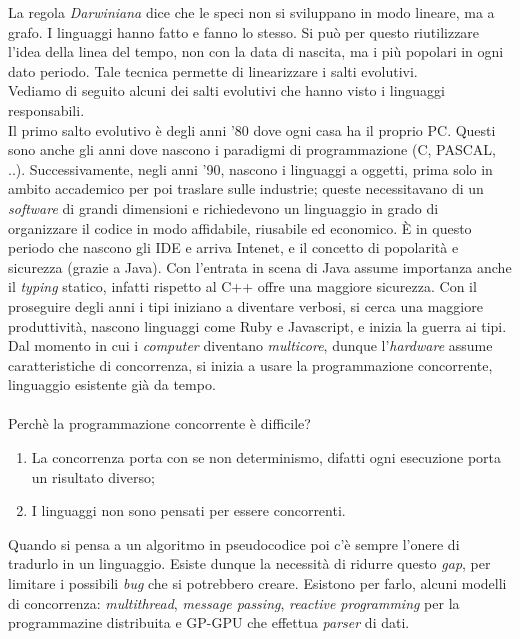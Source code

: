 \documentclass[10pt,a4paper]{book}
\begin{document}
La regola \textit{Darwiniana} dice che le speci non si sviluppano in modo lineare, ma a grafo. I linguaggi hanno fatto e fanno lo stesso. Si pu\`o per questo riutilizzare l'idea della linea del tempo, non con la data di nascita, ma i pi\`u popolari in ogni dato periodo. Tale tecnica permette di linearizzare i salti evolutivi.\\
Vediamo di seguito alcuni dei salti evolutivi che hanno visto i linguaggi responsabili.\\
Il primo salto evolutivo \`e degli anni '80 dove ogni casa ha il proprio PC. Questi sono anche gli anni dove nascono i paradigmi di programmazione (C, PASCAL, ..). Successivamente, negli anni '90, nascono i linguaggi a oggetti, prima solo in ambito accademico per poi traslare sulle industrie; queste necessitavano di un \textit{software} di grandi dimensioni e richiedevono un linguaggio in grado di organizzare il codice in modo affidabile, riusabile ed economico. \`E in questo periodo che nascono gli IDE e arriva Intenet, e il concetto di popolarit\`a e sicurezza (grazie a Java). Con l'entrata in scena di Java assume importanza anche il \textit{typing} statico, infatti rispetto al C++ offre una maggiore sicurezza. Con il proseguire degli anni i tipi iniziano a diventare verbosi, si cerca una maggiore produttivit\`a, nascono linguaggi come Ruby e Javascript, e inizia la guerra ai tipi. Dal momento in cui i \textit{computer} diventano \textit{multicore}, dunque l'\textit{hardware} assume caratteristiche di concorrenza, si inizia a usare la programmazione concorrente, linguaggio esistente gi\`a da tempo.\\\\
Perch\`e la programmazione concorrente \`e difficile?
\begin{enumerate}
\item La concorrenza porta con se non determinismo, difatti ogni esecuzione porta un risultato diverso;
\item I linguaggi non sono pensati per essere concorrenti.
\end{enumerate}
\noindent
Quando si pensa a un algoritmo in pseudocodice poi c'\`e sempre l'onere di tradurlo in un linguaggio. Esiste dunque la necessit\`a di ridurre questo \textit{gap}, per limitare i possibili \textit{bug} che si potrebbero creare. Esistono per farlo, alcuni modelli di concorrenza: \textit{multithread}, \textit{message passing}, \textit{reactive programming} per la programmazine distribuita e GP-GPU che effettua \textit{parser} di dati.\\\\
\end{document}
